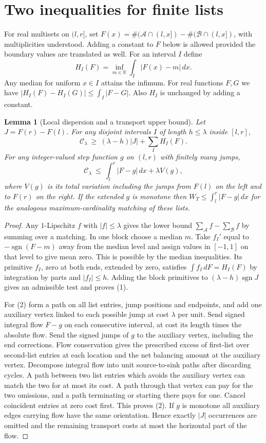 \documentclass[11pt]{article}
\newtheorem{lemma}[theorem]{Lemma}
\newcommand{\R}{\mathbb R}
\newcommand{\cost}{\mathcal C}
\newcommand{\A}{\mathcal A}
\newcommand{\B}{\mathcal B}
\begin{document}
\section{Two inequalities for finite lists}
For real multisets on $(l,r]$, set $F(x)=\#(\A\cap(l,x])-\#(\B\cap(l,x])$, with multiplicities understood. Adding a constant to $F$ below is allowed provided the boundary values are translated as well. For an interval $I$ define
\[
  H_I(F)=\inf_{m\in\R}\int_I |F(x)-m|\,dx .
\]
Any median for uniform $x\in I$ attains the infimum. For real functions $F,G$ we have
$|H_I(F)-H_I(G)|\le\int_I |F-G|$. Also $H_I$ is unchanged by adding a constant.

\begin{lemma}[Local dispersion and a transport upper bound]\label{le:flow}
Let $J=F(r)-F(l)$. For any disjoint intervals $I$ of length $h\le\lambda$ inside $[l,r]$,
\[
 \cost_\lambda\ \ge\ (\lambda-h)|J|+\sum_I H_I(F).                 \tag{1}
\]
For any integer-valued step function $g$ on $(l,r)$ with finitely many jumps,
\[
 \cost_\lambda\ \le\ \int_l^r|F-g|\,dx+\lambda V(g),             \tag{2}
\]
where $V(g)$ is its total variation including the jumps from $F(l)$ on the left and to $F(r)$ on the right. If the extended $g$ is monotone then $W_T\le\int_l^r|F-g|\,dx$ for the analogous maximum-cardinality matching of these lists.
\end{lemma}

\begin{proof}
Any $1$-Lipschitz $f$ with $|f|\le\lambda$ gives the lower bound $\sum_{\A}f-\sum_{\B}f$ by summing over a matching. In one block choose a median $m$. Take $f_I'$ equal to $-\operatorname{sgn}(F-m)$ away from the median level and assign values in $[-1,1]$ on that level to give mean zero. This is possible by the median inequalities. Its primitive $f_I$, zero at both ends, extended by zero, satisfies $\int f_I\,dF=H_I(F)$ by integration by parts and $|f_I|\le h$. Adding the block primitives to $(\lambda-h)\operatorname{sgn}J$ gives an admissible test and proves (1).

For (2) form a path on all list entries, jump positions and endpoints, and add one auxiliary vertex linked to each possible jump at cost $\lambda$ per unit. Send signed integral flow $F-g$ on each consecutive interval, at cost its length times the absolute flow. Send the signed jumps of $g$ to the auxiliary vertex, including the end corrections. Flow conservation gives the prescribed excess of first-list over second-list entries at each location and the net balancing amount at the auxiliary vertex. Decompose integral flow into unit source-to-sink paths after discarding cycles. A path between two list entries which avoids the auxiliary vertex can match the two for at most its cost. A path through that vertex can pay for the two omissions, and a path terminating or starting there pays for one. Cancel coincident entries at zero cost first. This proves (2). If $g$ is monotone all auxiliary edges carrying flow have the same orientation. Hence exactly $|J|$ occurrences are omitted and the remaining transport costs at most the horizontal part of the flow.
\end{proof}
\end{document}
